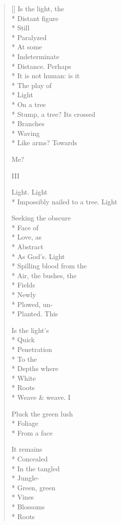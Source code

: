 \begin{verse}[\versewidth]
Is the light, the\\*
Distant figure\\*
Still\\*
Paralyzed \\*
At some\\*
Indeterminate\\*
Distance.    Perhaps\\*
It is not human: is it\\*
The play of \\*
Light\\*
On a tree\\*
Stump, a tree?    Its crossed\\*
Branches\\*
Waving\\*
Like arms?     Towards

Me?

 \qquad III

Light. Light\\*
Impossibly nailed to a tree.  Light

Seeking the obscure\\*
Face of\\*
Love, as\\*
Abstract\\*
As God's.   Light\\*
Spilling blood from the\\*
Air, the bushes, the\\*
Fields\\*
Newly \\*
Plowed, un-\\*
Planted.     This

Is the light's\\*
Quick\\*
Penetration\\*
To the\\*
Depths where\\*
White\\*
Roots\\*
Weave \& weave.     I

Pluck the green lush\\*
Foliage\\*
From a face

It remains \\*
Concealed\\*
In the tangled\\*
Jungle-\\*
Green, green\\*
Vines\\*
Blossoms\\*
Roots


\end{verse}
